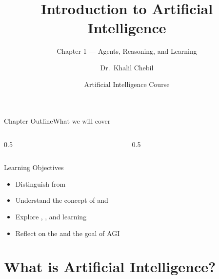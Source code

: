 \documentclass[aspectratio=169,11pt]{beamer}
\title[Ch.\,1 — Introduction]{Introduction to Artificial Intelligence}
\subtitle{Chapter 1 — Agents, Reasoning, and Learning}
\author{Dr.\ Khalil Chebil}
\date{Artificial Intelligence Course}
\begin{document}
{
\begin{frame}
  \titlepage
\end{frame}}

\begin{frame}{Chapter Outline}{What we will cover}
  \begin{columns}[T]
    \begin{column}{0.5\textwidth}
      \tableofcontents[sections={1-3}]
    \end{column}
    \begin{column}{0.5\textwidth}
      \tableofcontents[sections={4-6}]
    \end{column}
  \end{columns}
  \vfill
  \begin{block}{Learning Objectives}
    \begin{itemize}
      \item Distinguish  from 
      \item Understand the concept of  and 
      \item Explore , , and  learning
      \item Reflect on the  and the goal of AGI
    \end{itemize}
  \end{block}
\end{frame}

\section{What is Artificial Intelligence?}
\end{document}
